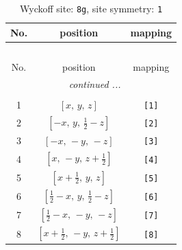 \documentclass[fleqn,8pt]{jsarticle}
\begin{document}
\renewcommand{\arraystretch}{1.2}
\begin{longtable}{ccc}
\caption{Wyckoff site: {\tt 8g}, site symmetry: {\tt 1}}
 \\
 \hline \hline
No. & position & mapping \\ \hline \endfirsthead

\multicolumn{2}{l}{\tablename\ \thetable{}} \\
 \hline \hline
No. & position & mapping \\ \hline \endhead

 \hline \hline
\multicolumn{2}{r}{\footnotesize\it continued ...} \\ \endfoot

 \hline \hline
\multicolumn{2}{r}{} \\ \endlastfoot

1 & $\left[ x,\, y,\, z \right]$ & {\tt [1]} \\ \hline
2 & $\left[ - x,\, y,\, \frac{1}{2} - z \right]$ & {\tt [2]} \\ \hline
3 & $\left[ - x,\, - y,\, - z \right]$ & {\tt [3]} \\ \hline
4 & $\left[ x,\, - y,\, z + \frac{1}{2} \right]$ & {\tt [4]} \\ \hline
5 & $\left[ x + \frac{1}{2},\, y,\, z \right]$ & {\tt [5]} \\ \hline
6 & $\left[ \frac{1}{2} - x,\, y,\, \frac{1}{2} - z \right]$ & {\tt [6]} \\ \hline
7 & $\left[ \frac{1}{2} - x,\, - y,\, - z \right]$ & {\tt [7]} \\ \hline
8 & $\left[ x + \frac{1}{2},\, - y,\, z + \frac{1}{2} \right]$ & {\tt [8]} \\
\end{longtable}
\end{document}
